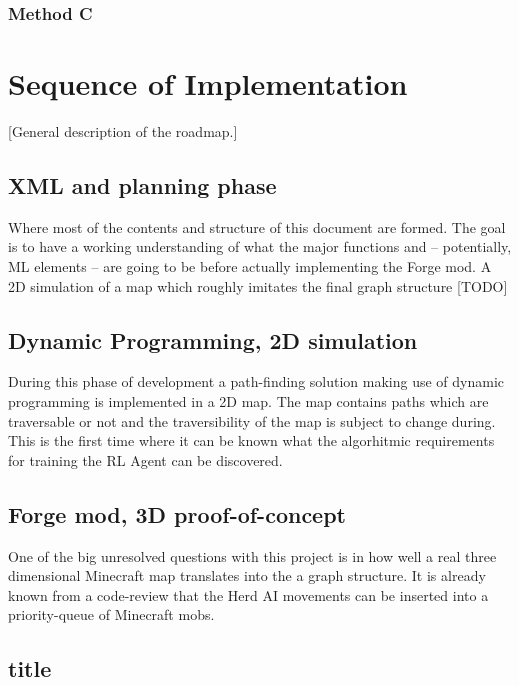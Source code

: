 \documentclass[]{article}
\begin{document}
\subsubsection{Method C}

\newpage

\section{Sequence of Implementation}

[General description of the roadmap.]

\subsection{XML and planning phase}

Where most of the contents and structure of this document are formed. The goal is to have a working understanding of what the major functions and -- potentially, ML elements -- are going to be before actually implementing the Forge mod. A 2D simulation of a map which roughly imitates the final graph structure [TODO]

\subsection{Dynamic Programming, 2D simulation}

During this phase of development a path-finding solution making use of dynamic programming is implemented in a 2D map. The map contains paths which are traversable or not and the traversibility of the map is subject to change during. This is the first time where it can be known what the algorhitmic requirements for training the RL Agent can be discovered.

\subsection{Forge mod, 3D proof-of-concept}

One of the big unresolved questions with this project is in how well a real three dimensional Minecraft map translates into the a graph structure. It is already known from a code-review that the Herd AI movements can be inserted into a priority-queue of Minecraft mobs.

\subsection{title}
\end{document}
